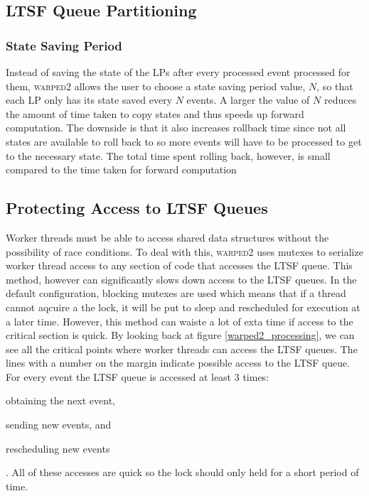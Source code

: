 \documentclass[11pt]{book}
\begin{document}
\subsection{LTSF Queue Partitioning}



\subsubsection{State Saving Period}

Instead of saving the state of the LPs after every processed event processed for them, \textsc{warped2}
allows the user to choose a state saving period value, $N$, so that each LP only has its state
saved every $N$ events. A larger the value of $N$ reduces the amount of time taken to copy states
and thus speeds up forward computation. The downside is that it also increases rollback time
since not all states are available to roll back to so more events will have to be processed to
get to the necessary state. The total time spent rolling back, however, is small compared to the
time taken for forward computation

\subsection{Protecting Access to LTSF Queues}

Worker threads must be able to access shared data structures without the possibility of
race conditions. To deal with this, \textsc{warped2} uses mutexes to serialize worker thread
access to any section of code that accesses the LTSF queue. This method, however can significantly
slows down access to the LTSF queues. In the default configuration, blocking mutexes are used
which means that if a thread cannot aqcuire a the lock, it will be put to sleep and rescheduled
for execution at a later time. However, this method can waiste a lot of exta time if access to the
critical section is quick. By looking back at figure \ref{warped2_processing}, we can see all
the critical points where worker threads can access the LTSF queues. The lines with a number on
the margin indicate possible access to the LTSF queue. For every event the LTSF queue is accessed
at least 3 times: \begin{inparaenum}[(1)] \item obtaining the next event, \item sending new
events, and \item rescheduling new events \end{inparaenum}. All of these accesses are quick so
the lock should only held for a short period of time.
\end{document}

